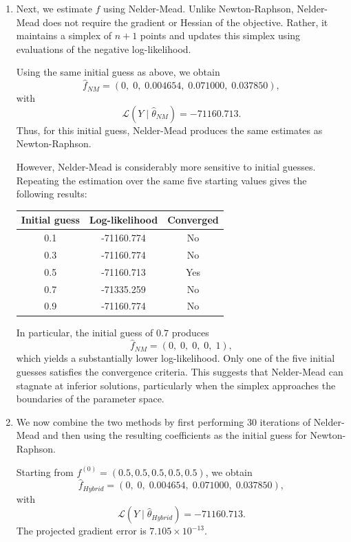 \documentclass{article}
\begin{document}
\begin{enumerate}
    \item[(b)]
    Next, we estimate $f$ using Nelder-Mead. Unlike Newton-Raphson,
    Nelder-Mead does not require the gradient or Hessian of the
    objective. Rather, it maintains a simplex of $n+1$ points and
    updates this simplex using evaluations of the negative
    log-likelihood.

    Using the same initial guess as above, we obtain
    \[
        \hat{f}_{NM}
        = (0,\;0,\;0.004654,\;0.071000,\;0.037850),
    \]
    with
    \[
        \mathcal{L}(Y\mid\hat{\theta}_{NM})
        = -71160.713.
    \]
    Thus, for this initial guess, Nelder-Mead produces the same
    estimates as Newton-Raphson.

    However, Nelder-Mead is considerably more sensitive to initial
    guesses. Repeating the estimation over the same five starting
    values gives the following results:
    \begin{center}
    \begin{tabular}{c c c}
        \hline
        Initial guess & Log-likelihood & Converged \\
        \hline
        0.1 & -71160.774 & No \\
        0.3 & -71160.774 & No \\
        0.5 & -71160.713 & Yes \\
        0.7 & -71335.259 & No \\
        0.9 & -71160.774 & No \\
        \hline
    \end{tabular}
    \end{center}
    In particular, the initial guess of $0.7$ produces
    \[
        \hat{f}_{NM}=(0,\;0,\;0,\;0,\;1),
    \]
    which yields a substantially lower log-likelihood. Only one
    of the five initial guesses satisfies the convergence criteria.
    This suggests that Nelder-Mead can stagnate at inferior solutions,
    particularly when the simplex approaches the boundaries of the
    parameter space.

    \item[(c)]
    We now combine the two methods by first performing 30 iterations
    of Nelder-Mead and then using the resulting coefficients as the
    initial guess for Newton-Raphson.

    Starting from $f^{(0)}=(0.5,0.5,0.5,0.5,0.5)$, we obtain
    \[
        \hat{f}_{Hybrid}
        = (0,\;0,\;0.004654,\;0.071000,\;0.037850),
    \]
    with
    \[
        \mathcal{L}(Y\mid\hat{\theta}_{Hybrid})
        = -71160.713.
    \]
    The projected gradient error is $7.105\times10^{-13}$.


\end{enumerate}
\end{document}

